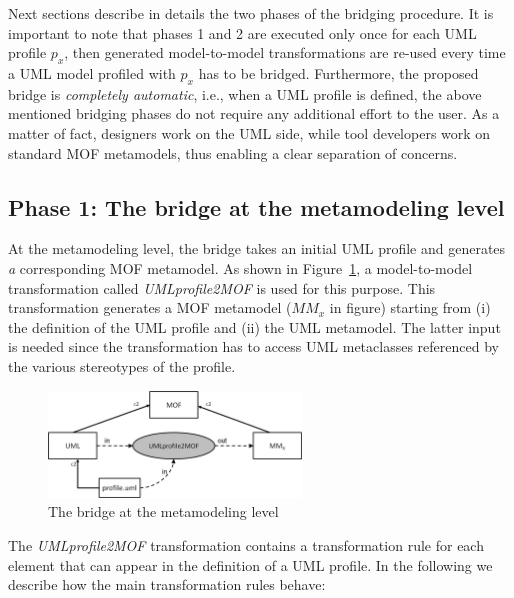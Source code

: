 Next sections describe in details the two phases of the bridging procedure.
It is important to note that phases 1 and 2 are executed only once for each UML profile $p_x$, then generated model-to-model transformations 
are re-used every time a UML model profiled with $p_x$ has to be bridged.
Furthermore, the proposed bridge is \textit{completely automatic}, i.e., when a UML profile is defined, the above mentioned bridging phases do not require any additional effort to the user. As a matter of fact, designers work on the UML side, while tool developers work on standard MOF metamodels, thus enabling a clear separation of concerns.


\subsection{Phase 1: The bridge at the metamodeling level}\label{sec:metamodelLevel}

At the metamodeling level, the bridge takes an initial UML profile and generates {\em a} corresponding MOF metamodel.
As shown in Figure~\ref{fig:metamodelingLevel}, a model-to-model transformation called
\textit{UMLprofile2MOF} is used for this purpose. This transformation generates a MOF metamodel ($MM_x$ in figure) starting from (i) the definition of the UML profile and (ii) the UML metamodel. The latter input is needed since the transformation has to access UML metaclasses referenced by the various stereotypes of the profile.

\begin{figure}[htbp]
	\centering
		\includegraphics[width=0.60\textwidth]{figures/metamodelingLevel.png}
	\caption{The bridge at the metamodeling level}
	\label{fig:metamodelingLevel}
\end{figure}


%
The \textit{UMLprofile2MOF} transformation contains a transformation rule for each element that can appear in the definition of a UML profile. In the following we describe how the main transformation rules behave:

